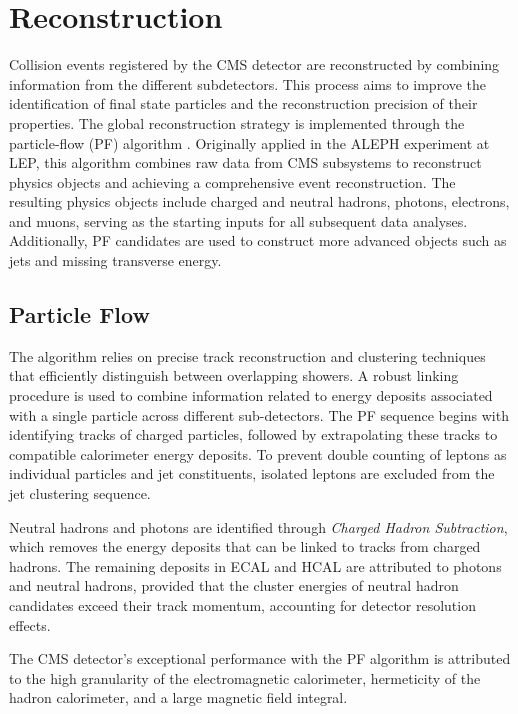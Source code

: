 \chapter{Reconstruction}

Collision events registered by the CMS detector are reconstructed by combining information from the different subdetectors.
This process aims to improve the identification of final state particles and the reconstruction precision of their properties.
The global reconstruction strategy is implemented through the particle-flow (PF) algorithm \cite{ParticleFlow}.
Originally applied in the ALEPH experiment at LEP, this algorithm combines raw data from CMS subsystems to reconstruct physics objects and achieving a comprehensive event reconstruction.
The resulting physics objects include charged and neutral hadrons, photons, electrons, and muons, serving as the starting inputs for all subsequent data analyses.
Additionally, PF candidates are used to construct more advanced objects such as jets and missing transverse energy.

\section{Particle Flow}
\label{sec:ParticleFlow}
The algorithm relies on precise track reconstruction and clustering techniques that efficiently distinguish between overlapping showers.
A robust linking procedure is used to combine information related to energy deposits associated with a single particle across different sub-detectors.
The PF sequence begins with identifying tracks of charged particles, followed by extrapolating these tracks to compatible calorimeter energy deposits.
To prevent double counting of leptons as individual particles and jet constituents, isolated leptons are excluded from the jet clustering sequence.

Neutral hadrons and photons are identified through \textit{Charged Hadron Subtraction}, which removes the energy deposits that can be linked to tracks from charged hadrons.
The remaining deposits in ECAL and HCAL are attributed to photons and neutral hadrons,
provided that the cluster energies of neutral hadron candidates exceed their track momentum, accounting for detector resolution effects.

The CMS detector's exceptional performance with the PF algorithm is attributed to the high granularity of the electromagnetic calorimeter, hermeticity of the hadron calorimeter, and a large magnetic field integral.

